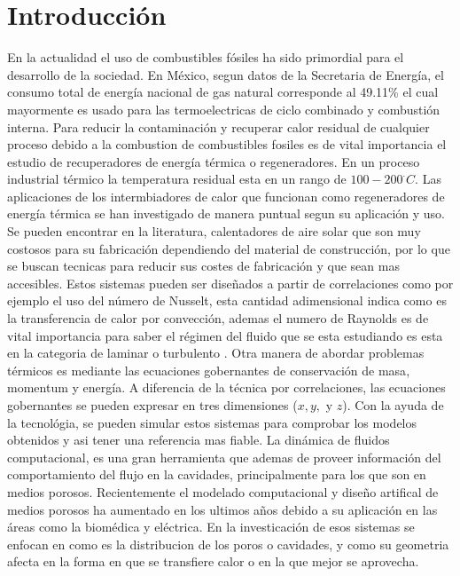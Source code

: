 

\chapter{Introducción}

En la actualidad el uso de combustibles f\'osiles ha sido primordial para el desarrollo de la sociedad. En M\'exico, segun datos de la Secretaria de Energ\'ia, el consumo total de energ\'ia nacional de gas natural corresponde al 49.11\% el cual mayormente es usado para las termoelectricas de ciclo combinado y combusti\'on interna\cite{BNE2021}. Para reducir la contaminaci\'on y recuperar calor residual de cualquier proceso debido a la combustion de combustibles fosiles es de vital importancia el estudio de recuperadores de energ\'ia t\'ermica o regeneradores. En un proceso industrial t\'ermico la temperatura residual esta en un rango de $100-200 ^\cdot C$\cite{Anish2021}. 
\newline
Las aplicaciones de los intermbiadores de calor que funcionan como regeneradores de energ\'ia t\'ermica se han investigado de manera puntual segun su aplicaci\'on y uso. Se pueden encontrar en la literatura, calentadores de aire solar que son muy costosos para su fabricaci\'on dependiendo del material de construcci\'on, por lo que se buscan tecnicas para reducir sus costes de fabricaci\'on y que sean mas accesibles\cite{Abbas2022}.
\newline
Estos sistemas pueden ser dise\~nados a partir de correlaciones como por ejemplo el uso del n\'umero de Nusselt, esta cantidad adimensional indica como es la transferencia de calor por convecci\'on\cite{Pimsarn2022}, ademas el numero de Raynolds es de vital importancia para saber el r\'egimen del fluido que se esta estudiando es esta en la categoria de laminar o turbulento \cite{Kong2022}.
\newline
Otra manera de abordar problemas t\'ermicos es mediante las ecuaciones gobernantes de conservaci\'on de masa\cite{Zhao2023}, momentum y energ\'ia. A diferencia de la t\'ecnica por correlaciones, las ecuaciones gobernantes se pueden expresar en tres dimensiones ($x, y,$ y $z$)\cite{Rehman2022}.
Con la ayuda de la tecnol\'ogia, se pueden simular estos sistemas para comprobar los modelos obtenidos y asi tener una referencia mas fiable. La din\'amica de fluidos computacional, es una gran herramienta que ademas de proveer informaci\'on del comportamiento del flujo en la cavidades, principalmente para los que son en medios porosos\cite{Prajapati2022}.
\newline
Recientemente el modelado computacional y dise\~no artifical de medios porosos ha aumentado en los ultimos a\~nos debido a su aplicaci\'on en las \'areas como la biom\'edica y el\'ectrica. En la investicaci\'on de esos sistemas se enfocan en como es la distribucion de los poros o cavidades, y como su geometria afecta en la forma en que se transfiere calor o en la que mejor se aprovecha\cite{Prajapati2022}.
\newline

